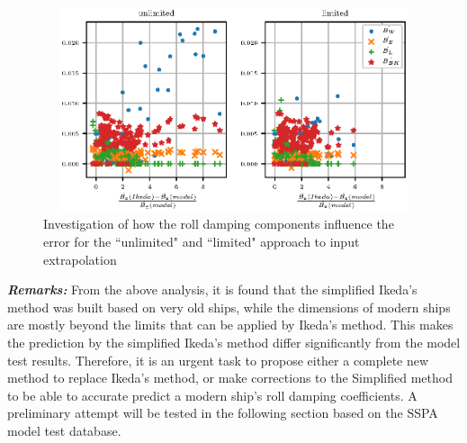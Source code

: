 \begin{figure}[H]
\vspace{-0.5cm}
\centering
  \centering
  \includegraphics[height=6cm, width = 14cm]{figures/ikeda_components.eps}
  \vspace{-0.5cm}
  \caption{Investigation of how the roll damping components influence the error for the ``unlimited" and ``limited" approach to input extrapolation}
  \label{fig:ikeda_components}
\end{figure}

\textbf{\textit{Remarks:}} From the above analysis, it is found that the simplified Ikeda's method was built based on very old ships, while the dimensions of modern ships are mostly beyond the limits that can be applied by Ikeda's method. This makes the prediction by the simplified Ikeda's method differ significantly from the model test results.
Therefore, it is an urgent task to propose either a complete new method to replace Ikeda's method, or make corrections to the Simplified method to be able to accurate predict a modern ship's roll damping coefficients. A preliminary attempt will be tested in the following section based on the SSPA model test database.